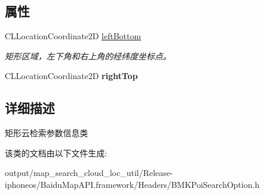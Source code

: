 \subsection*{属性}
\begin{DoxyCompactItemize}
\item 
\hypertarget{interface_b_m_k_bound_search_option_ad68044c4ded82d49551ea014f20e5b67}{}C\+L\+Location\+Coordinate2\+D \hyperlink{interface_b_m_k_bound_search_option_ad68044c4ded82d49551ea014f20e5b67}{left\+Bottom}\label{interface_b_m_k_bound_search_option_ad68044c4ded82d49551ea014f20e5b67}

\begin{DoxyCompactList}\small\item\em 矩形区域，左下角和右上角的经纬度坐标点。 \end{DoxyCompactList}\item 
\hypertarget{interface_b_m_k_bound_search_option_a6864fdcb6ad4d284a17a31d76a4e54f8}{}C\+L\+Location\+Coordinate2\+D {\bfseries right\+Top}\label{interface_b_m_k_bound_search_option_a6864fdcb6ad4d284a17a31d76a4e54f8}

\end{DoxyCompactItemize}


\subsection{详细描述}
矩形云检索参数信息类 

该类的文档由以下文件生成\+:\begin{DoxyCompactItemize}
\item 
output/map\+\_\+search\+\_\+cloud\+\_\+loc\+\_\+util/\+Release-\/iphoneos/\+Baidu\+Map\+A\+P\+I.\+framework/\+Headers/B\+M\+K\+Poi\+Search\+Option.\+h\end{DoxyCompactItemize}

